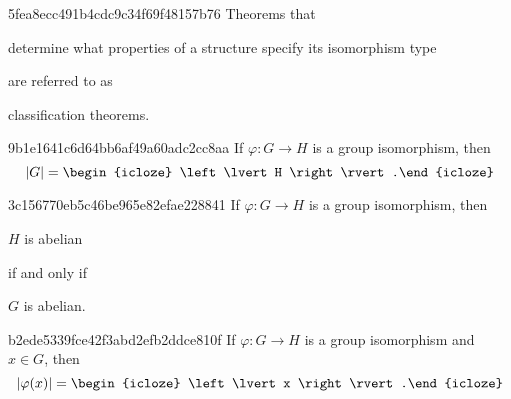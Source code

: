 \begin{note}{5fea8ecc491b4cdc9c34f69f48157b76}
    Theorems that \begin{icloze}{2}determine what properties of a structure specify its isomorphism type\end{icloze} are referred to as \begin{icloze}{1}classification theorems.\end{icloze}
\end{note}

\begin{note}{9b1e1641c6d64bb6af49a60adc2cc8aa}
    If \({ \varphi : G \to H }\) is a group isomorphism, then
    \[
        \left\lvert G \right\rvert = \begin{icloze}{1}\left\lvert H \right\rvert.\end{icloze}
    \]
\end{note}

\begin{note}{3c156770eb5c46be965e82efae228841}
    If \({ \varphi : G \to H }\) is a group isomorphism, then
    \begin{center}
        \({ H }\) is abelian \begin{icloze}{2}if and only if\end{icloze} \begin{icloze}{1}\({ G }\) is abelian.\end{icloze}
    \end{center}
\end{note}

\begin{note}{b2ede5339fce42f3abd2efb2ddce810f}
    If \({ \varphi : G \to H }\) is a group isomorphism and \({ x \in G }\), then
    \[
        \left\lvert \varphi(x) \right\rvert = \begin{icloze}{1}\left\lvert x \right\rvert.\end{icloze}
    \]
\end{note}

